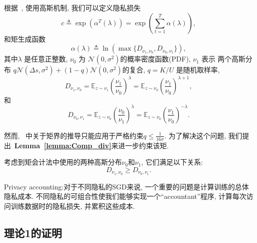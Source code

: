 根据~\cite{abadi2016DLwithDP}, 使用高斯机制, 我们可以定义隐私损失
\begin{equation}
c \triangleq \exp\left(\alpha^{T}(\lambda)\right) = \exp\left(\sum_{t=1}^{T}\alpha(\lambda)\right),
\end{equation}
和矩生成函数
\begin{equation}
\alpha(\lambda) \triangleq \ln(\max \{D_{\nu_{1},\nu_{0}}, D_{\nu_{0},\nu_{1}}\}),
\end{equation}
其中$\lambda$ 是任意正整数, $\nu_{0}$ 为 $\mathcal{N}(0,\sigma^{2})$的概率密度函数(PDF), $\nu_{1}$ 表示 两个高斯分布 $q\mathcal{N}(\Delta s,\sigma^{2})+(1-q)\mathcal{N}(0,\sigma^{2})$的复合, $q=K/U$ 是随机取样率,
\begin{equation}
D_{\nu_{1},\nu_{0}}=\mathbb{E}_{z\sim \nu_{1}}\left(\frac{\nu_{1}}{\nu_{0}}\right)^{\lambda}=\mathbb{E}_{z\sim \nu_{0}}\left(\frac{\nu_{1}}{\nu_{0}}\right)^{\lambda+1},
\end{equation}
和
\begin{equation}
D_{\nu_{0},\nu_{1}}=\mathbb{E}_{z\sim \nu_{0}}\left(\frac{\nu_{0}}{\nu_{1}}\right)^{\lambda}=\mathbb{E}_{z\sim \nu_{0}}\left(\frac{\nu_{1}}{\nu_{0}}\right)^{-\lambda}.
\end{equation}


然而, ~\cite{abadi2016DLwithDP}中关于矩界的推导只能应用于严格约束$q \leq \frac{1}{16\sigma}$. 
为了解决这个问题, 我们提出~\textbf{Lemma~\ref{lemma:Comp_div}}来进一步约束该矩. 
\begin{lemma}\label{lemma:Comp_div}

考虑到矩会计法中使用的两种高斯分布$\nu_{0}$和$\nu_{1}$, 它们满足以下关系: 
\begin{equation}
D_{\nu_{1},\nu_{0}}\geq D_{\nu_{0},\nu_{1}}.
\end{equation}
\end{lemma}

 
Privacy accounting:对于不同隐私的SGD来说, 一个重要的问题是计算训练的总体隐私成本. 不同隐私的可组合性使我们能够实现一个“accountant”程序, 计算每次访问训练数据时的隐私损失, 并累积这些成本. 



\subsection{理论1的证明}
 
